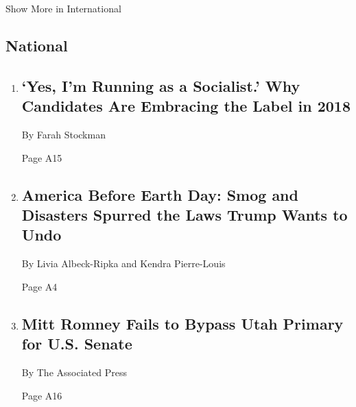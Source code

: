 Show More in International

\hypertarget{national}{%
\subsection{National}\label{national}}

\begin{enumerate}
\def\labelenumi{\arabic{enumi}.}
\item
  \href{/2018/04/20/us/dsa-socialism-candidates-midterms.html}{}

  \hypertarget{yes-im-running-as-a-socialist-why-candidates-are-embracing-the-label-in-2018-1}{%
  \subsection{`Yes, I'm Running as a Socialist.' Why Candidates Are
  Embracing the Label in
  2018}\label{yes-im-running-as-a-socialist-why-candidates-are-embracing-the-label-in-2018-1}}

  By Farah Stockman

  Page A15
\item
  \href{/2018/04/21/climate/environmental-disasters-earth-day.html}{}

  \hypertarget{america-before-earth-day-smog-and-disasters-spurred-the-laws-trump-wants-to-undo}{%
  \subsection{America Before Earth Day: Smog and Disasters Spurred the
  Laws Trump Wants to
  Undo}\label{america-before-earth-day-smog-and-disasters-spurred-the-laws-trump-wants-to-undo}}

  By Livia Albeck-Ripka and Kendra Pierre-Louis

  Page A4
\item
  \href{/2018/04/21/us/politics/mitt-romney-convention-primary.html}{}

  \hypertarget{mitt-romney-fails-to-bypass-utah-primary-for-us-senate}{%
  \subsection{Mitt Romney Fails to Bypass Utah Primary for U.S.
  Senate}\label{mitt-romney-fails-to-bypass-utah-primary-for-us-senate}}

  By The Associated Press

  Page A16
\end{enumerate}

